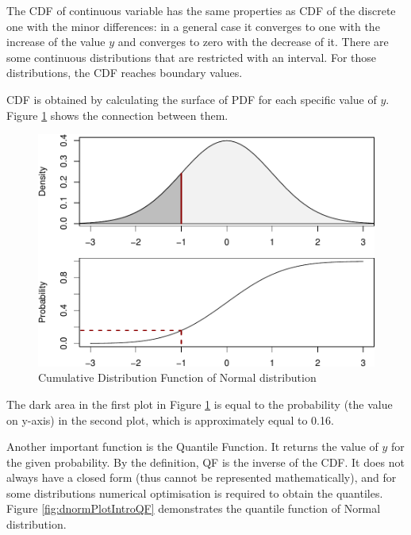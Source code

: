 \documentclass[
]{book}
\theoremstyle{definition}
\theoremstyle{definition}
\theoremstyle{definition}
\theoremstyle{definition}
\theoremstyle{remark}
\begin{document}
The CDF of continuous variable has the same properties as CDF of the discrete one with the minor differences: in a general case it converges to one with the increase of the value \(y\) and converges to zero with the decrease of it. There are some continuous distributions that are restricted with an interval. For those distributions, the CDF reaches boundary values.

CDF is obtained by calculating the surface of PDF for each specific value of \(y\). Figure \ref{fig:dnormPlotIntroCDFPDF} shows the connection between them.

\begin{figure}
\centering
\includegraphics{Svetunkov---Statistics-for-Business-Analytics_files/figure-latex/dnormPlotIntroCDFPDF-1.pdf}
\caption{\label{fig:dnormPlotIntroCDFPDF}Cumulative Distribution Function of Normal distribution}
\end{figure}

The dark area in the first plot in Figure \ref{fig:dnormPlotIntroCDFPDF} is equal to the probability (the value on y-axis) in the second plot, which is approximately equal to 0.16.

Another important function is the Quantile Function. It returns the value of \(y\) for the given probability. By the definition, QF is the inverse of the CDF. It does not always have a closed form (thus cannot be represented mathematically), and for some distributions numerical optimisation is required to obtain the quantiles. Figure \ref{fig:dnormPlotIntroQF} demonstrates the quantile function of Normal distribution.
\end{document}
